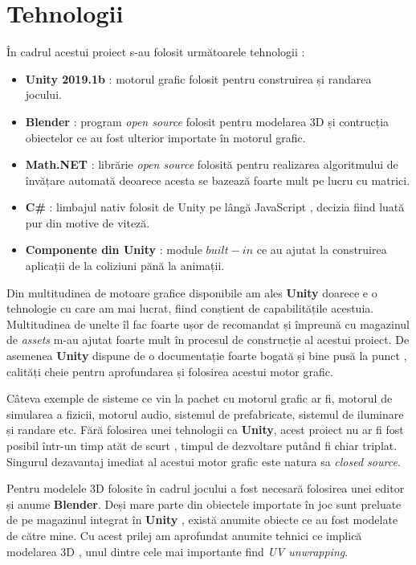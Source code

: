 \chapter{Tehnologii}

În cadrul acestui proiect s-au folosit următoarele tehnologii :
\begin{itemize}
\item \textbf{Unity 2019.1b} : motorul grafic folosit pentru construirea și randarea jocului.
\item \textbf{Blender} : program \textit{open source} folosit pentru modelarea 3D și contrucția obiectelor ce au fost ulterior importate în motorul grafic.
\item \textbf{Math.NET} : librărie \textit{open source} folosită pentru realizarea algoritmului de învățare automată deoarece acesta se bazează foarte mult pe lucru cu matrici.
\item \textbf{C\#} : limbajul nativ folosit de Unity pe lângă JavaScript , decizia fiind luată pur din motive de viteză.
\item \textbf{Componente din Unity} : module $built-in$ ce au ajutat la construirea aplicații de la coliziuni pănă la animații.
\end{itemize}

Din multitudinea de motoare grafice disponibile am ales \textbf{Unity} doarece e o tehnologie cu care am mai lucrat, fiind conștient de capabilitățile acestuia. Multitudinea de unelte îl fac foarte ușor de recomandat și împreună cu magazinul de \textit{assets} m-au ajutat foarte mult în procesul de construcție al acestui proiect. De asemenea \textbf{Unity} dispune de o documentație foarte bogată și bine pusă la punct , calități cheie pentru aprofundarea și folosirea acestui motor grafic.\par

Câteva exemple de sisteme ce vin la pachet cu motorul grafic ar fi, motorul de simularea a fizicii, motorul audio, sistemul de prefabricate, sistemul de iluminare și randare etc. Fără folosirea unei tehnologii ca \textbf{Unity}, acest proiect nu ar fi fost posibil într-un timp atăt de scurt , timpul de dezvoltare putând fi chiar triplat. Singurul dezavantaj imediat al acestui motor grafic este natura sa \textit{closed source}.\par

Pentru modelele 3D folosite în cadrul jocului a fost necesară folosirea unei editor și anume \textbf{Blender}. Deși mare parte din obiectele importate în joc sunt preluate de pe magazinul integrat în \textbf{Unity} , există anumite obiecte ce au fost modelate de către mine. Cu acest prilej am aprofundat anumite tehnici ce implică modelarea 3D , unul dintre cele mai importante find \textit {UV unwrapping}.\par

